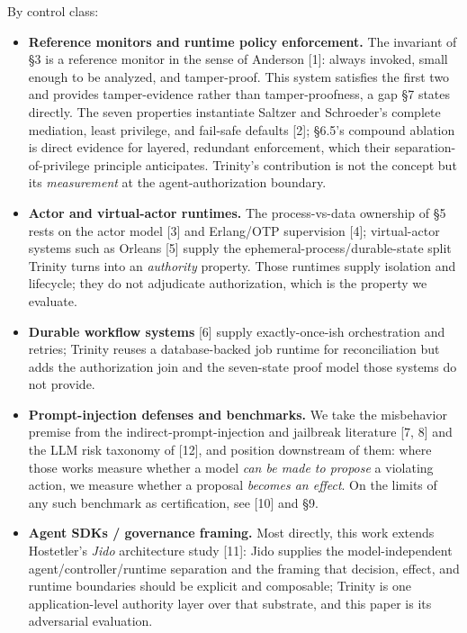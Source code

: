 \documentclass[11pt]{article}
\providecommand{\tightlist}{%
 \setlength{\itemsep}{0pt}\setlength{\parskip}{0pt}}
\begin{document}
By control class:

\begin{itemize}
\tightlist
\item
 \textbf{Reference monitors and runtime policy enforcement.} The invariant of \S3 is a reference
 monitor in the sense of Anderson {[}1{]}: always invoked, small enough to be analyzed, and
 tamper-proof. This system satisfies the first two and provides tamper-evidence rather than
 tamper-proofness, a gap \S7 states directly. The seven properties instantiate Saltzer and Schroeder's complete mediation,
 least privilege, and fail-safe defaults {[}2{]}; \S6.5's compound ablation is direct evidence for
 layered, redundant enforcement, which their separation-of-privilege principle anticipates. Trinity's contribution is not the concept but its \emph{measurement} at
 the agent-authorization boundary.
\item
 \textbf{Actor and virtual-actor runtimes.} The process-vs-data ownership of \S5 rests on the actor
 model {[}3{]} and Erlang/OTP supervision {[}4{]}; virtual-actor systems such as Orleans {[}5{]} supply
 the ephemeral-process/durable-state split Trinity turns into an \emph{authority} property. Those
 runtimes supply isolation and lifecycle; they do not adjudicate authorization, which is the
 property we evaluate.
\item
 \textbf{Durable workflow systems} {[}6{]} supply exactly-once-ish orchestration and retries; Trinity
 reuses a database-backed job runtime for reconciliation but adds the authorization join and
 the seven-state proof model those systems do not provide.
\item
 \textbf{Prompt-injection defenses and benchmarks.} We take the misbehavior premise from the
 indirect-prompt-injection and jailbreak literature {[}7, 8{]} and the LLM risk taxonomy of {[}12{]},
 and position downstream of them: where those works measure whether a model \emph{can be made to
 propose} a violating action, we measure whether a proposal \emph{becomes an effect}. On the
 limits of any such benchmark as certification, see {[}10{]} and \S9.
\item
 \textbf{Agent SDKs / governance framing.} Most directly, this work extends Hostetler's \emph{Jido}
 architecture study {[}11{]}: Jido supplies the model-independent agent/controller/runtime
 separation and the framing that decision, effect, and runtime boundaries should be explicit
 and composable; Trinity is one application-level authority layer over that substrate, and
 this paper is its adversarial evaluation.
\end{itemize}
\end{document}
